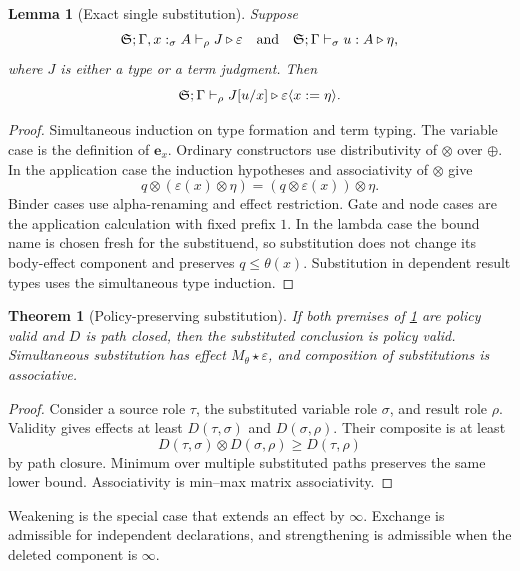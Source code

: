 \documentclass[11pt]{article}
\numberwithin{equation}{section}
\theoremstyle{definition}
\theoremstyle{plain}
\newtheorem{theorem}[definition]{Theorem}
\newtheorem{lemma}[definition]{Lemma}
\theoremstyle{remark}
\newcommand{\eps}{\varepsilon}
\newcommand{\unit}{\mathbf e}
\newcommand{\absent}{\boldsymbol\infty}
\begin{document}
\begin{lemma}[Exact single substitution]\label{lem:substitution}
Suppose
\[
 \AFDeclSignature;\Gamma,x:_{\sigma}A\vdash_{\rho} J\triangleright\eps
 \quad\text{and}\quad
 \AFDeclSignature;\Gamma\vdash_{\sigma} u:A\triangleright\eta,
\]
where \(J\) is either a type or a term judgment.  Then
\[
 \AFDeclSignature;\Gamma\vdash_{\rho} J[u/x]
 \triangleright\eps\langle x:=\eta\rangle.
\]
\end{lemma}

\begin{proof}
Simultaneous induction on type formation and term typing.  The variable case
is the definition of \(\unit_x\).  Ordinary constructors use distributivity
of \(\otimes\) over \(\oplus\).  In the application case the induction
hypotheses and associativity of \(\otimes\) give
\[
 q\otimes(\eps(x)\otimes\eta)
 =(q\otimes\eps(x))\otimes\eta.
\]
Binder cases use alpha-renaming and effect restriction.  Gate and node cases
are the application calculation with fixed prefix \(1\).  In the lambda case
the bound name is chosen fresh for the substituend, so substitution does not
change its body-effect component and preserves \(q\le\theta(x)\).
Substitution in dependent result types uses the simultaneous type induction.
\end{proof}

\begin{theorem}[Policy-preserving substitution]\label{thm:substitution}
If both premises of \cref{lem:substitution} are policy valid and \(D\) is path
closed, then the substituted conclusion is policy valid.  Simultaneous
substitution has effect \(M_\theta\star\eps\), and composition of
substitutions is associative.
\end{theorem}

\begin{proof}
Consider a source role \(\tau\), the substituted variable role \(\sigma\),
and result role \(\rho\).  Validity gives effects at least
\(D(\tau,\sigma)\) and \(D(\sigma,\rho)\).  Their composite is at least
\[
 D(\tau,\sigma)\otimes D(\sigma,\rho)
 \ge D(\tau,\rho)
\]
by path closure.  Minimum over multiple substituted paths preserves the same
lower bound.  Associativity is min--max matrix associativity.
\end{proof}

Weakening is the special case that extends an effect by
\(\absent\).  Exchange is admissible for independent declarations, and
strengthening is admissible when the deleted component is \(\absent\).
\end{document}
